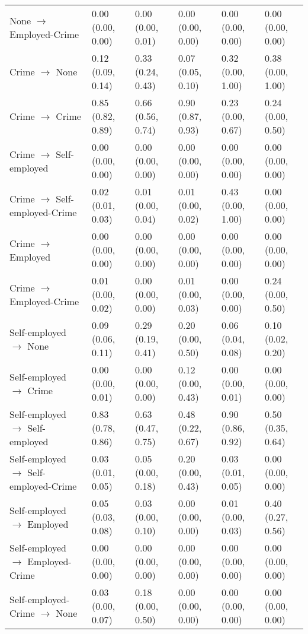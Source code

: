 \begin{scriptsize}
{\begin{longtable}{llllll}
  \quad None $\rightarrow$ Employed-Crime & 0.00 (0.00, 0.00) & 0.00 (0.00, 0.01) & 0.00 (0.00, 0.00) & 0.00 (0.00, 0.00) & 0.00 (0.00, 0.00) \\ 
   \addlinespace[12pt] 
\quad Crime $\rightarrow$ None & 0.12 (0.09, 0.14) & 0.33 (0.24, 0.43) & 0.07 (0.05, 0.10) & 0.32 (0.00, 1.00) & 0.38 (0.00, 1.00) \\ 
  \quad Crime $\rightarrow$ Crime & 0.85 (0.82, 0.89) & 0.66 (0.56, 0.74) & 0.90 (0.87, 0.93) & 0.23 (0.00, 0.67) & 0.24 (0.00, 0.50) \\ 
  \quad Crime $\rightarrow$ Self-employed & 0.00 (0.00, 0.00) & 0.00 (0.00, 0.00) & 0.00 (0.00, 0.00) & 0.00 (0.00, 0.00) & 0.00 (0.00, 0.00) \\ 
  \quad Crime $\rightarrow$ Self-employed-Crime & 0.02 (0.01, 0.03) & 0.01 (0.00, 0.04) & 0.01 (0.00, 0.02) & 0.43 (0.00, 1.00) & 0.00 (0.00, 0.00) \\ 
  \quad Crime $\rightarrow$ Employed & 0.00 (0.00, 0.00) & 0.00 (0.00, 0.00) & 0.00 (0.00, 0.00) & 0.00 (0.00, 0.00) & 0.00 (0.00, 0.00) \\ 
  \quad Crime $\rightarrow$ Employed-Crime & 0.01 (0.00, 0.02) & 0.00 (0.00, 0.00) & 0.01 (0.00, 0.03) & 0.00 (0.00, 0.00) & 0.24 (0.00, 0.50) \\ 
   \addlinespace[12pt] 
\quad Self-employed $\rightarrow$ None & 0.09 (0.06, 0.11) & 0.29 (0.19, 0.41) & 0.20 (0.00, 0.50) & 0.06 (0.04, 0.08) & 0.10 (0.02, 0.20) \\ 
  \quad Self-employed $\rightarrow$ Crime & 0.00 (0.00, 0.01) & 0.00 (0.00, 0.00) & 0.12 (0.00, 0.43) & 0.00 (0.00, 0.01) & 0.00 (0.00, 0.00) \\ 
  \quad Self-employed $\rightarrow$ Self-employed & 0.83 (0.78, 0.86) & 0.63 (0.47, 0.75) & 0.48 (0.22, 0.67) & 0.90 (0.86, 0.92) & 0.50 (0.35, 0.64) \\ 
  \quad Self-employed $\rightarrow$ Self-employed-Crime & 0.03 (0.01, 0.05) & 0.05 (0.00, 0.18) & 0.20 (0.00, 0.43) & 0.03 (0.01, 0.05) & 0.00 (0.00, 0.00) \\ 
  \quad Self-employed $\rightarrow$ Employed & 0.05 (0.03, 0.08) & 0.03 (0.00, 0.10) & 0.00 (0.00, 0.00) & 0.01 (0.00, 0.03) & 0.40 (0.27, 0.56) \\ 
  \quad Self-employed $\rightarrow$ Employed-Crime & 0.00 (0.00, 0.00) & 0.00 (0.00, 0.00) & 0.00 (0.00, 0.00) & 0.00 (0.00, 0.00) & 0.00 (0.00, 0.00) \\ 
   \addlinespace[12pt] 
\quad Self-employed-Crime $\rightarrow$ None & 0.03 (0.00, 0.07) & 0.18 (0.00, 0.50) & 0.00 (0.00, 0.00) & 0.00 (0.00, 0.00) & 0.00 (0.00, 0.00) \\ 

\end{longtable}}
\end{scriptsize}
